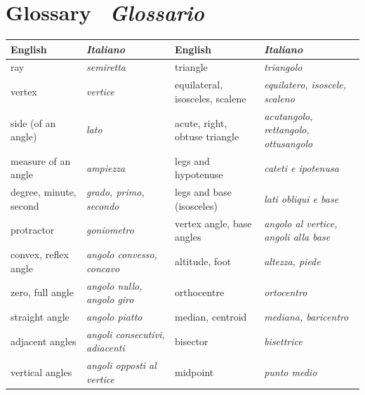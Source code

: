 \label{app:glossary}

\section*{Glossary \textperiodcentered\ {\color{itgreen}\itshape Glossario}}
{\small
\renewcommand{\arraystretch}{1.12}
\begin{tabularx}{\textwidth}{@{}>{\raggedright\arraybackslash}X >{\raggedright\arraybackslash\itshape\leavevmode\color{itgreen}}X | >{\raggedright\arraybackslash}X >{\raggedright\arraybackslash\itshape\leavevmode\color{itgreen}}X@{}}
\toprule
\rowcolor{white}
\textbf{English} & \textbf{\upshape Italiano} & \textbf{English} & \textbf{\upshape Italiano}\\
\midrule
ray                     & semiretta                  & triangle                  & triangolo\\
vertex                  & vertice                    & equilateral, isosceles, scalene & equilatero, isoscele, scaleno\\
side (of an angle)      & lato                       & acute, right, obtuse triangle & acutangolo, rettangolo, ottusangolo\\
measure of an angle     & ampiezza                   & legs and hypotenuse       & cateti e ipotenusa\\
degree, minute, second  & grado, primo, secondo      & legs and base (isosceles) & lati obliqui e base\\
protractor              & goniometro                 & vertex angle, base angles & angolo al vertice, angoli alla base\\
convex, reflex angle    & angolo convesso, concavo   & altitude, foot            & altezza, piede\\
zero, full angle        & angolo nullo, angolo giro  & orthocentre               & ortocentro\\
straight angle          & angolo piatto              & median, centroid          & mediana, baricentro\\
adjacent angles         & angoli consecutivi, adiacenti & bisector               & bisettrice\\
vertical angles         & angoli opposti al vertice  & midpoint                  & punto medio\\

\end{tabularx}}
